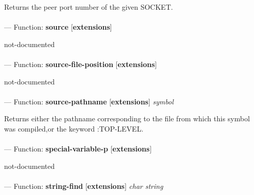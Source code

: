 \begin{adjustwidth}{5em}{5em}
Returns the peer port number of the given SOCKET.
\end{adjustwidth}

\paragraph{}
\label{EXTENSIONS:SOURCE}
--- Function: \textbf{source} [\textbf{extensions}] \textit{}

\begin{adjustwidth}{5em}{5em}
not-documented
\end{adjustwidth}

\paragraph{}
\label{EXTENSIONS:SOURCE-FILE-POSITION}
--- Function: \textbf{source-file-position} [\textbf{extensions}] \textit{}

\begin{adjustwidth}{5em}{5em}
not-documented
\end{adjustwidth}

\paragraph{}
\label{EXTENSIONS:SOURCE-PATHNAME}
--- Function: \textbf{source-pathname} [\textbf{extensions}] \textit{symbol}

\begin{adjustwidth}{5em}{5em}
Returns either the pathname corresponding to the file from which this symbol was compiled,or the keyword :TOP-LEVEL.
\end{adjustwidth}

\paragraph{}
\label{EXTENSIONS:SPECIAL-VARIABLE-P}
--- Function: \textbf{special-variable-p} [\textbf{extensions}] \textit{}

\begin{adjustwidth}{5em}{5em}
not-documented
\end{adjustwidth}

\paragraph{}
\label{EXTENSIONS:STRING-FIND}
--- Function: \textbf{string-find} [\textbf{extensions}] \textit{char string}

